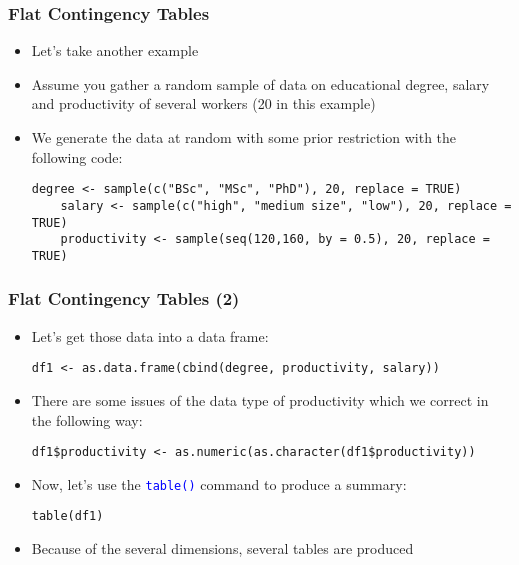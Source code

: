 \documentclass[10pt]{beamer}
\newcommand{\cc}[1]{\texttt{\textcolor{blue}{#1}}}
\theoremstyle{definition}
\begin{document}
\begin{frame}[fragile]
\frametitle{Flat Contingency Tables}
\begin{itemize}
	\item Let's take another example
	
	\item Assume you gather a random sample of data on educational degree, salary and productivity of several workers (20 in this example)
	
	\item We generate the data at random with some prior restriction with the following code:
	\begin{lstlisting}[style = rstyle, breaklines]
	degree <- sample(c("BSc", "MSc", "PhD"), 20, replace = TRUE)
	salary <- sample(c("high", "medium size", "low"), 20, replace = TRUE)
	productivity <- sample(seq(120,160, by = 0.5), 20, replace = TRUE)
	\end{lstlisting}
\end{itemize}
\end{frame}

\begin{frame}[fragile]
\frametitle{Flat Contingency Tables (2)}
\begin{itemize}
	\item Let's get those data into a data frame:
	\begin{lstlisting}[style = rstyle, breaklines]
	df1 <- as.data.frame(cbind(degree, productivity, salary))
	\end{lstlisting}
	
	\item There are some issues of the data type of productivity which we correct in the following way:
	\begin{lstlisting}[style = rstyle, breaklines]
	df1$productivity <- as.numeric(as.character(df1$productivity))
	\end{lstlisting}

	\item Now, let's use the \cc{table()} command to produce a summary:
	\begin{lstlisting}[style = rstyle, breaklines]
	table(df1)
	\end{lstlisting}

	\item Because of the several dimensions, several tables are produced
\end{itemize}
\end{frame}
\end{document}
